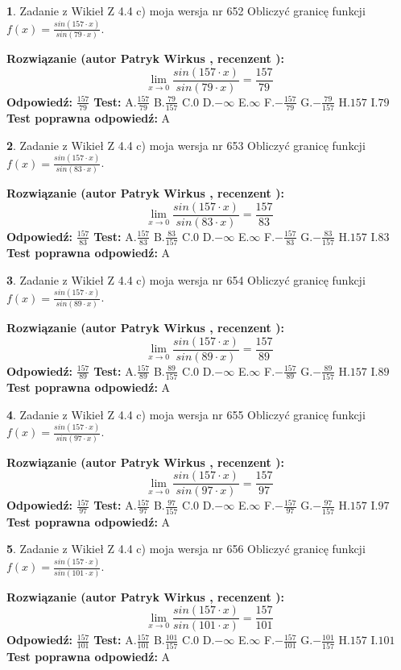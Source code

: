 \documentclass[12pt, a4paper]{article}
\theoremstyle{definition} %
\newtheorem{zad}{}
\newcommand{\zadStart}[1]{\begin{zad}#1\newline}
\newcommand{\zadStop}{\end{zad}}
\newcommand{\rozwStart}[2]{\noindent \textbf{Rozwiązanie (autor #1 , recenzent #2): }\newline}
\newcommand{\rozwStop}{\newline}
\newcommand{\odpStart}{\noindent \textbf{Odpowiedź:}\newline}
\newcommand{\odpStop}{\newline}
\newcommand{\testStart}{\noindent \textbf{Test:}\newline}
\newcommand{\testStop}{\newline}
\newcommand{\kluczStart}{\noindent \textbf{Test poprawna odpowiedź:}\newline}
\newcommand{\kluczStop}{\newline}
\begin{document}
\zadStart{Zadanie z Wikieł Z 4.4 c) moja wersja nr 652}
Obliczyć granicę funkcji $f(x)=\frac{sin(157\cdot x)}{sin(79\cdot x)}$.
\zadStop
\rozwStart{Patryk Wirkus}{}
$$\lim\limits_{x\to 0}\frac{sin(157\cdot x)}{sin(79\cdot x)}=
\frac{157}{79}$$
\rozwStop
\odpStart
$\frac{157}{79}$
\odpStop
\testStart
A.$\frac{157}{79}$
B.$\frac{79}{157}$
C.$0$
D.$-\infty$
E.$\infty$
F.$-\frac{157}{79}$
G.$-\frac{79}{157}$
H.$157$
I.$79$
\testStop
\kluczStart
A
\kluczStop



\zadStart{Zadanie z Wikieł Z 4.4 c) moja wersja nr 653}
Obliczyć granicę funkcji $f(x)=\frac{sin(157\cdot x)}{sin(83\cdot x)}$.
\zadStop
\rozwStart{Patryk Wirkus}{}
$$\lim\limits_{x\to 0}\frac{sin(157\cdot x)}{sin(83\cdot x)}=
\frac{157}{83}$$
\rozwStop
\odpStart
$\frac{157}{83}$
\odpStop
\testStart
A.$\frac{157}{83}$
B.$\frac{83}{157}$
C.$0$
D.$-\infty$
E.$\infty$
F.$-\frac{157}{83}$
G.$-\frac{83}{157}$
H.$157$
I.$83$
\testStop
\kluczStart
A
\kluczStop



\zadStart{Zadanie z Wikieł Z 4.4 c) moja wersja nr 654}
Obliczyć granicę funkcji $f(x)=\frac{sin(157\cdot x)}{sin(89\cdot x)}$.
\zadStop
\rozwStart{Patryk Wirkus}{}
$$\lim\limits_{x\to 0}\frac{sin(157\cdot x)}{sin(89\cdot x)}=
\frac{157}{89}$$
\rozwStop
\odpStart
$\frac{157}{89}$
\odpStop
\testStart
A.$\frac{157}{89}$
B.$\frac{89}{157}$
C.$0$
D.$-\infty$
E.$\infty$
F.$-\frac{157}{89}$
G.$-\frac{89}{157}$
H.$157$
I.$89$
\testStop
\kluczStart
A
\kluczStop



\zadStart{Zadanie z Wikieł Z 4.4 c) moja wersja nr 655}
Obliczyć granicę funkcji $f(x)=\frac{sin(157\cdot x)}{sin(97\cdot x)}$.
\zadStop
\rozwStart{Patryk Wirkus}{}
$$\lim\limits_{x\to 0}\frac{sin(157\cdot x)}{sin(97\cdot x)}=
\frac{157}{97}$$
\rozwStop
\odpStart
$\frac{157}{97}$
\odpStop
\testStart
A.$\frac{157}{97}$
B.$\frac{97}{157}$
C.$0$
D.$-\infty$
E.$\infty$
F.$-\frac{157}{97}$
G.$-\frac{97}{157}$
H.$157$
I.$97$
\testStop
\kluczStart
A
\kluczStop



\zadStart{Zadanie z Wikieł Z 4.4 c) moja wersja nr 656}
Obliczyć granicę funkcji $f(x)=\frac{sin(157\cdot x)}{sin(101\cdot x)}$.
\zadStop
\rozwStart{Patryk Wirkus}{}
$$\lim\limits_{x\to 0}\frac{sin(157\cdot x)}{sin(101\cdot x)}=
\frac{157}{101}$$
\rozwStop
\odpStart
$\frac{157}{101}$
\odpStop
\testStart
A.$\frac{157}{101}$
B.$\frac{101}{157}$
C.$0$
D.$-\infty$
E.$\infty$
F.$-\frac{157}{101}$
G.$-\frac{101}{157}$
H.$157$
I.$101$
\testStop
\kluczStart
A
\kluczStop
\end{document}
